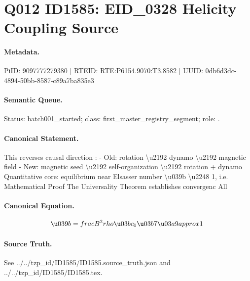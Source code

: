 \section*{Q012 ID1585: EID\_0328 Helicity Coupling Source}
\paragraph{Metadata.}
PiID: 9097777279380 | RTEID: RTE:P6154.9070:T3.8582 | UUID: 0db6d3dc-4894-50bb-8587-c89a7ba835e3

\paragraph{Semantic Queue.}
Status: batch001\_started; class: first\_master\_registry\_segment; role: .

\paragraph{Canonical Statement.}
This reverses causal direction : - Old: rotation \textbackslash{}u2192 dynamo \textbackslash{}u2192 magnetic field - New: magnetic seed \textbackslash{}u2192 self-organization \textbackslash{}u2192 rotation + dynamo Quantitative core: equilibrium near Elsasser number \textbackslash{}u039b \textbackslash{}u2248 1, i.e. Mathematical Proof The Universality Theorem establishes convergenc All

\paragraph{Canonical Equation.}
\[
\u039b = \\frac{B^2}{\\rho \u03bc_0 \u03b7 \u03a9} \\approx 1 \
\]

\paragraph{Source Truth.}
See ../../tzp\_id/ID1585/ID1585.source\_truth.json and ../../tzp\_id/ID1585/ID1585.tex.
